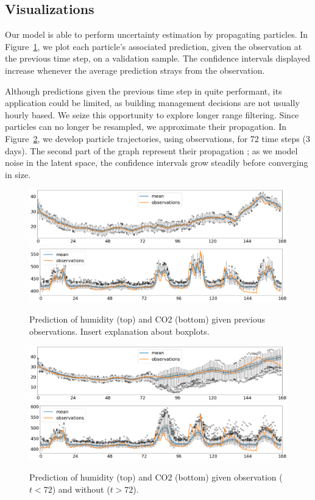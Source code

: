 \documentclass{article}
\begin{document}
\subsection{Visualizations}%
\label{sub:visualizations}
Our model is able to perform uncertainty estimation by propagating particles.
In Figure~\ref{fig:filter_k+1}, we plot each particle's associated prediction, given the observation at the previous time step, on a validation sample.
The confidence intervals displayed increase whenever the average prediction strays from the observation.

Although predictions given the previous time step in quite performant, its application could be limited, as building management decisions are not usually hourly based.
We seize this opportunity to explore longer range filtering.
Since particles can no longer be resampled, we approximate their propagation.
In Figure~\ref{fig:filter_k+24}, we develop particle trajectories, using observations, for 72 time steps (3 days).
The second part of the graph represent their propagation ; as we model noise in the latent space, the confidence intervals grow steadily before converging in size.

\begin{figure}[htpb]
	\centering
	\includegraphics[width=\linewidth]{filter_kp1_hum.png}
	\includegraphics[width=\linewidth]{filter_kp1_co2.png}
	\caption{Prediction of humidity (top) and CO2 (bottom) given previous observations. Insert explanation about boxplots.}%
	\label{fig:filter_k+1}
\end{figure}

\begin{figure}[htpb]
	\centering
	\includegraphics[width=\linewidth]{filter_kp24_hum.png}
	\includegraphics[width=\linewidth]{filter_kp24_co2.png}
	\caption{Prediction of humidity (top) and CO2 (bottom) given observation ($t<72$) and without ($t > 72$).}%
	\label{fig:filter_k+24}
\end{figure}
\end{document}

